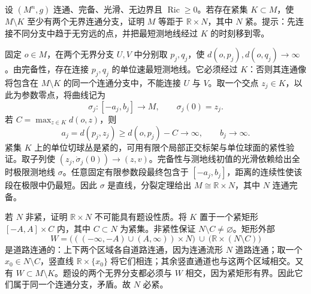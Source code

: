 \begin{optionalexercise}\label{g3:ex:two-ends-splitting}
	设 \((M^n,g)\) 连通、完备、光滑、无边界且 \(\operatorname{Ric}\ge0\)。若存在紧集 \(K\subset M\)，使 \(M\setminus K\) 至少有两个无界连通分支，证明 \(M\) 等距于 \(\mathbb R\times N\)，其中 \(N\) 紧。提示：先连接不同分支中趋于无穷远的点，并把最短测地线经过 \(K\) 的时刻移到零。
\end{optionalexercise}
\begin{solution}
	固定 \(o\in M\)，在两个无界分支 \(U,V\) 中分别取 \(p_j,q_j\)，使 \(d(o,p_j),d(o,q_j)\to\infty\)。由完备性，存在连接 \(p_j,q_j\) 的单位速最短测地线。它必须经过 \(K\)：否则其连通像将包含在 \(M\setminus K\) 的同一个连通分支中，不能连接 \(U\) 与 \(V\)。取一个交点 \(z_j\in K\)，以此为参数零点，将曲线记为
	\[
		\sigma_j:[-a_j,b_j]\to M,
		\qquad \sigma_j(0)=z_j.
	\]
	若 \(C=\max_{z\in K}d(o,z)\)，则
	\[
		a_j=d(p_j,z_j)\ge d(o,p_j)-C\to\infty,
		\qquad b_j\to\infty.
	\]
	紧集 \(K\) 上的单位切球丛是紧的，可用有限个局部正交标架与单位球面的紧性验证。取子列使 \((z_j,\dot\sigma_j(0))\to(z,v)\)。完备性与测地线初值的光滑依赖给出全时极限测地线 \(\sigma\)。任意固定有限参数段最终包含于 \([-a_j,b_j]\)，距离的连续性使该段在极限中仍最短。因此 \(\sigma\) 是直线，分裂定理给出 \(M\cong\mathbb R\times N\)，其中 \(N\) 连通完备。

	若 \(N\) 非紧，证明 \(\mathbb R\times N\) 不可能具有题设性质。将 \(K\) 置于一个紧矩形 \([-A,A]\times C\) 内，其中 \(C\subset N\) 为紧集。非紧性保证 \(N\setminus C\ne\varnothing\)。矩形外部
	\[
		W=\bigl(((-\infty,-A)\cup(A,\infty))\times N\bigr)
		\ \cup\ \bigl(\mathbb R\times(N\setminus C)\bigr)
	\]
	是道路连通的：上下两个区域各自道路连通，因为连通流形 \(N\) 道路连通；取一个 \(x_0\in N\setminus C\)，竖直线 \(\mathbb R\times\{x_0\}\) 将它们相连；其余竖直通道也与这两个区域相交。又有 \(W\subset M\setminus K\)。题设的两个无界分支都必须与 \(W\) 相交，因为紧矩形有界。因此它们属于同一个连通分支，矛盾。故 \(N\) 必紧。
\end{solution}
